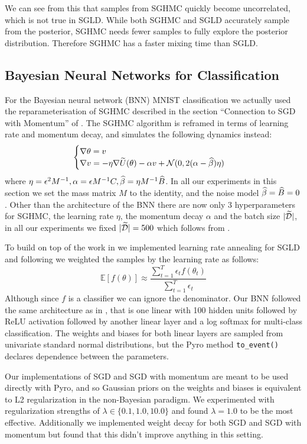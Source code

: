 We can see from this that samples from SGHMC quickly become uncorrelated, which is not true in SGLD. While both SGHMC and SGLD accurately sample from the posterior, SGHMC needs fewer samples to fully explore the posterior distribution. Therefore SGHMC has a faster mixing time than SGLD.

\subsection{Bayesian Neural Networks for Classification}
For the Bayesian neural network (BNN) MNIST classification we actually used the reparameterisation of SGHMC described in the section ``Connection to SGD with Momentum'' of \cite{sghmc}. The SGHMC algorithm is reframed in terms of learning rate and momentum decay, and simulates the following dynamics instead:
$$\begin{cases}
\nabla \theta = v\\
\nabla v = - \eta \nabla \widetilde{U}(\theta) - \alpha v + \mathcal{N}(0, 2(\alpha - \widehat{\beta}) \eta)
\end{cases}
$$
where $\eta = \epsilon^2 M^{-1}, \alpha = \epsilon M^{-1}C, \widehat{\beta} = \eta M^{-1}\widehat{B}$. In all our experiments in this section we set the mass matrix $M $ to the identity, and the noise model $\widehat{\beta} = \widehat{B} = 0$. Other than the architecture of the BNN there are now only 3 hyperparameters for SGHMC, the learning rate $\eta$, the momentum decay $\alpha$ and the batch size $|\widetilde{\mathcal{D}}|$, in all our experiments we fixed $|\widetilde{\mathcal{D}}| = 500$ which follows from \cite{sghmc}.

To build on top of the work in \cite{sghmc} we implemented learning rate annealing for SGLD and following \cite{sgld} we weighted the samples by the learning rate as follows:
$$\mathbb{E}[f(\theta)] \approx \frac{\sum^T_{t=1} \epsilon_t f(\theta_t)}{\sum^T_{t=1} \epsilon_t}$$
Although since $f$ is a classifier we can ignore the denominator. Our BNN followed the same architecture as in \cite{sghmc}, that is one linear with 100 hidden units followed by ReLU activation followed by another linear layer and a log softmax for multi-class classification. The weights and biases for both linear layers are sampled from univariate standard normal distributions, but the Pyro method \texttt{to\_event()} declares dependence between the parameters. 

Our implementations of SGD and SGD with momentum are meant to be used directly with Pyro, and so Gaussian priors on the weights and biases is equivalent to L2 regularization in the non-Bayesian paradigm. We experimented with regularization strengths of $\lambda \in \{0.1, 1.0, 10.0\}$ and found $\lambda = 1.0$ to be the most effective. Additionally we implemented weight decay for both SGD and SGD with momentum but found that this didn't improve anything in this setting.

